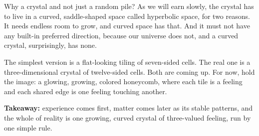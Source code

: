 Why a crystal and not just a random pile? As we will earn slowly, the crystal has to live in a curved, saddle-shaped space called hyperbolic space, for two reasons. It needs endless room to grow, and curved space has that. And it must not have any built-in preferred direction, because our universe does not, and a curved crystal, surprisingly, has none.

The simplest version is a flat-looking tiling of seven-sided cells. The real one is a three-dimensional crystal of twelve-sided cells. Both are coming up. For now, hold the image: a glowing, growing, colored honeycomb, where each tile is a feeling and each shared edge is one feeling touching another.

\textbf{Takeaway:} experience comes first, matter comes later as its stable patterns, and the whole of reality is one growing, curved crystal of three-valued feeling, run by one simple rule.
